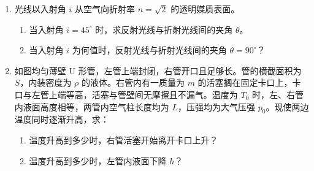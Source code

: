 \documentclass[\gkver]{gaokaozhenti}
\begin{document}
\begin{enumerate}
\item
光线以入射角 $i$ 从空气向折射率 $n = \sqrt{2}$ 的透明媒质表面。
\begin{enumerate}
	\item
	当入射角 $i = 45^{\circ}$ 时，求反射光线与折射光线间的夹角 $\theta$。
	\item
	当入射角 $i$ 为何值时，反射光线与折射光线间的夹角 $\theta = 90^{\circ}$？
\end{enumerate}
\onepicture[w=5cm, align=right]{}

\item
如图均匀薄壁 U 形管，左管上端封闭，右管开口且足够长。管的横截面积为 $S$，内装密度为 $\rho$ 的液体。右管内有一质量为 $m$ 的活塞搁在固定卡口上，卡口与左管上端等高，活塞与管壁间无摩擦且不漏气。温度为 $T_{0}$ 时，左、右管内液面高度相等，两管内空气柱长度均为 $L$，压强均为大气压强 $p_{0}$。现使两边温度同时逐渐升高，求：
\begin{enumerate}
	\item
	温度升高到多少时，右管活塞开始离开卡口上升？
	\item
	温度升高到多少时，左管内液面下降 $h$？
\end{enumerate}
\onepicture[h=5cm, align=right]{}
\end{enumerate}
\end{document}

